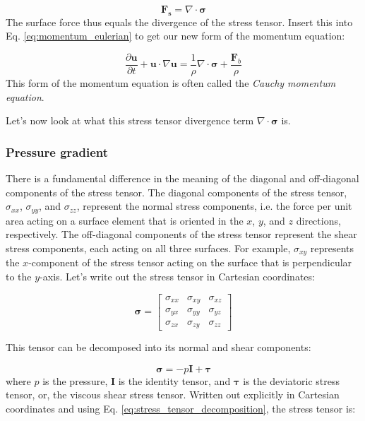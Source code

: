 \documentclass[12pt]{article}
\numberwithin{equation}{section}
\numberwithin{figure}{section}
\numberwithin{table}{section}
\begin{document}
\begin{equation}
  \mathbf{F_s} = \nabla \cdot \boldsymbol{\sigma}
\end{equation}
The surface force thus equals the divergence of the stress tensor.
Insert this into Eq. \ref{eq:momentum_eulerian} to get our new form of
the momentum equation:

\begin{equation}
  \frac{\partial \mathbf{u}}{\partial t} + \mathbf{u} \cdot \nabla \mathbf{u} =
  \frac{1}{\rho} \nabla \cdot \boldsymbol{\sigma} + \frac{\mathbf{F}_b}{\rho}
  \label{eq:momentum_cauchy}
\end{equation}
This form of the momentum equation is often called the
\textit{Cauchy momentum equation}.

Let's now look at what this stress tensor divergence term
$\nabla \cdot \boldsymbol{\sigma}$ is.

\subsubsection{Pressure gradient}

There is a fundamental difference in the meaning of the diagonal and off-diagonal
components of the stress tensor.
The diagonal components of the stress tensor, $\sigma_{xx}$, $\sigma_{yy}$, and
$\sigma_{zz}$, represent the normal stress components, i.e. the force per unit
area acting on a surface element that is oriented in the $x$, $y$, and $z$
directions, respectively.
The off-diagonal components of the stress tensor represent the shear stress
components, each acting on all three surfaces.
For example, $\sigma_{xy}$ represents the $x$-component of the stress tensor
acting on the surface that is perpendicular to the $y$-axis.
Let's write out the stress tensor in Cartesian coordinates:

\begin{equation}
  \boldsymbol{\sigma} = \begin{bmatrix}
    \sigma_{xx} & \sigma_{xy} & \sigma_{xz} \\
    \sigma_{yx} & \sigma_{yy} & \sigma_{yz} \\
    \sigma_{zx} & \sigma_{zy} & \sigma_{zz}
  \end{bmatrix}
\end{equation}

This tensor can be decomposed into its normal and shear components:

\begin{equation}
  \boldsymbol{\sigma} = -p \mathbf{I} + \boldsymbol{\tau}
  \label{eq:stress_tensor_decomposition}
\end{equation}
where $p$ is the pressure, $\mathbf{I}$ is the identity tensor,
and $\boldsymbol{\tau}$ is the deviatoric stress tensor, or, the viscous shear
stress tensor.
Written out explicitly in Cartesian coordinates and using Eq.
\ref{eq:stress_tensor_decomposition}, the stress tensor is:
\end{document}
